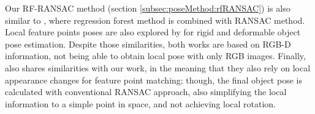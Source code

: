 \documentclass[annual]{acmsiggraph}
\begin{document}
Our RF-RANSAC method (section \ref{subsec:poseMethod:rfRANSAC}) is also similar to \cite{Brachmann:2014}, where regression forest method is combined with RANSAC method. Local feature points poses are also explored by \cite{Tokunaga:2015} for rigid and deformable object pose estimation. Despite those similarities, both works are based on RGB-D information, not being able to obtain local pose with only RGB images. Finally, \cite{Wu:2008} also shares similarities with our work, in the meaning that they also rely on local appearance changes for feature point matching; though, the final object pose is calculated with conventional RANSAC approach, also simplifying the local information to a simple point in space, and not achieving local rotation.    


%
\end{document}
